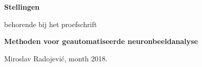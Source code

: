 \documentclass[10pt, twoside]{report}
\begin{document}
\pagestyle{empty}
\setlength{\parindent}{0pt}
\setlength{\leftmargini}{1.5em}

\vspace*{-14mm}
\begin{center}
  {\Large\bf Stellingen}

  \medskip

  behorende bij het proefschrift

  \medskip

  {\large\bf  Methoden voor geautomatiseerde neuronbeeldanalyse}

  \medskip

  Miroslav Radojevi\'{c}, month 2018.
\end{center}

\bigskip
\small
\end{document}
